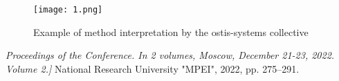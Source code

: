 \documentclass {article}
\begin{document}
\setcounter{figure}{2}

\begin{figure}
    \centering
   
\texttt{[image: 1.png]}

    \caption{ Example of method interpretation by the ostis-systems collective}
    
  
    \end{figure}
\setlength{\parskip}{0pt}%
\begin{multicols}{2}

 \footnotesize%
 
\noindent
\leftskip=8mm 
\textit {Proceedings of the Conference. In 2 volumes, Moscow, December
21-23, 2022. Volume 2.]} National Research University "MPEI", 2022, pp. 275–291.


\end{multicols}
\end{document}
